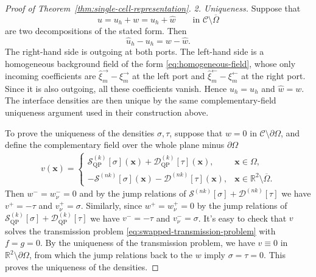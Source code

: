 \begin{proof}[Proof of Theorem~\ref{thm:single-cell-representation}]
\emph{2. Uniqueness.}
Suppose that
\[
  u=u_h+w=\widehat u_h+\widehat w
  \qquad\text{in }\mathcal C\setminus\overline\Omega
\]
are two decompositions of the stated form. Then
\[
  \widehat u_h-u_h=w-\widehat w.
\]
The right-hand side is outgoing at both ports. The left-hand side is a
homogeneous background field of the form \eqref{eq:homogeneous-field}, whose
only incoming coefficients are
$\widehat\xi_m^\rightarrow-\xi_m^\rightarrow$ at the left port and
$\widehat\xi_m^\leftarrow-\xi_m^\leftarrow$ at the right port. Since it is
also outgoing, all these coefficients vanish. Hence
$\widehat u_h=u_h$ and $\widehat w=w$. The interface densities are then
unique by the same complementary-field uniqueness argument used in their
construction above.

To prove the uniqueness of the densities $\sigma, \tau$, suppose that $w = 0$ in 
$\mathcal{C} \setminus \partial \Omega$, and define the complementary field over 
the whole plane minus $\partial \Omega$
\begin{align}
  v(\mathbf{x}) = \begin{cases}
    \mathcal{S}^{(k)}_\mathrm{QP}[\sigma](\mathbf{x}) + \mathcal{D}^{(k)}_\mathrm{QP}[\tau](\mathbf{x}), & \mathbf{x} \in \Omega,\\
    -\mathcal{S}^{(nk)}[\sigma](\mathbf{x}) - \mathcal{D}^{(nk)}[\tau](\mathbf{x}), & \mathbf{x} \in \mathbb{R}^2 \setminus \overline{\Omega}.
  \end{cases}
\end{align}
Then $w^- = w^-_\nu = 0$ and by the jump relations of 
$\mathcal{S}^{(nk)}[\sigma]+ \mathcal{D}^{(nk)}[\tau]$ we have $v^+ = -\tau$ and $v_\nu^+ = \sigma$. Similarly, since $w^+ = w^+_\nu = 0$ by the jump relations of $\mathcal{S}^{(k)}_\mathrm{QP}[\sigma]+ \mathcal{D}^{(k)}_\mathrm{QP}[\tau]$ we have $v^- = -\tau$ and $v_\nu^- = \sigma$.
It's easy to check that $v$ solves the transmission problem 
\eqref{eq:swapped-transmission-problem} with $f = g = 0$. By the uniqueness of the transmission problem, we have $v \equiv 0$ in $\mathbb{R}^2 \setminus \partial \Omega$, 
from which the jump relations back to the $w$ imply $\sigma = \tau = 0$. This proves the uniqueness of the densities.
\end{proof}
